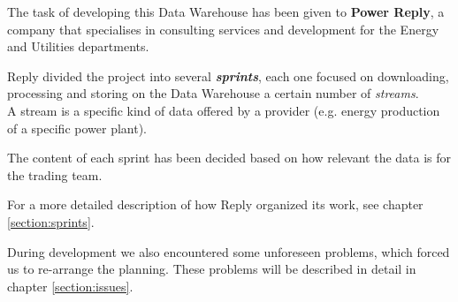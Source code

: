 The task of developing this Data Warehouse has been given to \textbf{Power Reply}, a company that specialises in consulting services and development for the Energy and Utilities departments.

Reply divided the project into several \textit{\textbf{sprints}}, each one focused on downloading, processing and storing on the Data Warehouse a certain number of \textit{streams}. \\
A stream is a specific kind of data offered by a provider (e.g. energy production of a specific power plant).

The content of each sprint has been decided based on how relevant the data is for the trading team.

For a more detailed description of how Reply organized its work, see chapter \ref{section:sprints}.

During development we also encountered some unforeseen problems, which forced us to re-arrange the planning. These problems will be described in detail in chapter \ref{section:issues}.